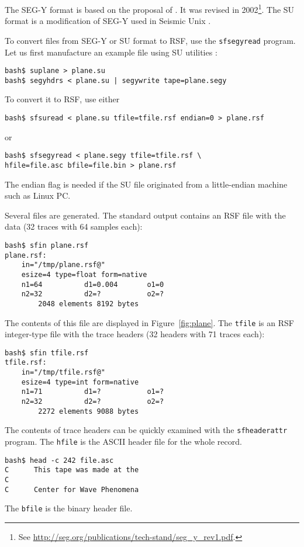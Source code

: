 The SEG-Y format is based on the proposal of \cite{GEO40-02-03440352}.
It was revised in 2002\footnote{See \url{http://seg.org/publications/tech-stand/seg_y_rev1.pdf}.}. The
SU format is a modification of SEG-Y used in Seismic Unix
\cite[]{TLE16-07-10451049}.

To convert files from SEG-Y or SU format to RSF, use the \texttt{sfsegyread}
program. Let us first manufacture an example file using SU utilities
\cite[]{su}:
\begin{verbatim}
bash$ suplane > plane.su
bash$ segyhdrs < plane.su | segywrite tape=plane.segy
\end{verbatim}
To convert it to RSF, use either
\begin{verbatim}
bash$ sfsuread < plane.su tfile=tfile.rsf endian=0 > plane.rsf
\end{verbatim}
or
\begin{verbatim}
bash$ sfsegyread < plane.segy tfile=tfile.rsf \
hfile=file.asc bfile=file.bin > plane.rsf
\end{verbatim}
The endian flag is needed if the SU file originated from a little-endian
machine such as Linux PC.

Several files are generated. The standard output contains an RSF file with the
data (32 traces with 64 samples each):
\begin{verbatim}
bash$ sfin plane.rsf
plane.rsf:
    in="/tmp/plane.rsf@"
    esize=4 type=float form=native
    n1=64          d1=0.004       o1=0
    n2=32          d2=?           o2=?
        2048 elements 8192 bytes
\end{verbatim}
The contents of this file are displayed in Figure~\ref{fig:plane}.
The \texttt{tfile} is an RSF integer-type file with the trace headers (32
headers with 71 traces each):
\begin{verbatim}
bash$ sfin tfile.rsf
tfile.rsf:
    in="/tmp/tfile.rsf@"
    esize=4 type=int form=native
    n1=71          d1=?           o1=?
    n2=32          d2=?           o2=?
        2272 elements 9088 bytes
\end{verbatim}
The contents of trace headers can be quickly examined with the 
\texttt{sfheaderattr} program.
The \texttt{hfile} is the ASCII header file for the whole record.
\begin{verbatim}
bash$ head -c 242 file.asc
C      This tape was made at the
C                                                                              
C      Center for Wave Phenomena                         
\end{verbatim}
The  \texttt{bfile} is the binary header file.

